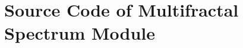 
\chapter{Source Code of Multifractal Spectrum Module} %
\label{AppendixB} %
\usepackage{listings}
\lstset{language=C++} 



\begin{lstlisting}



\end{lstlisting}